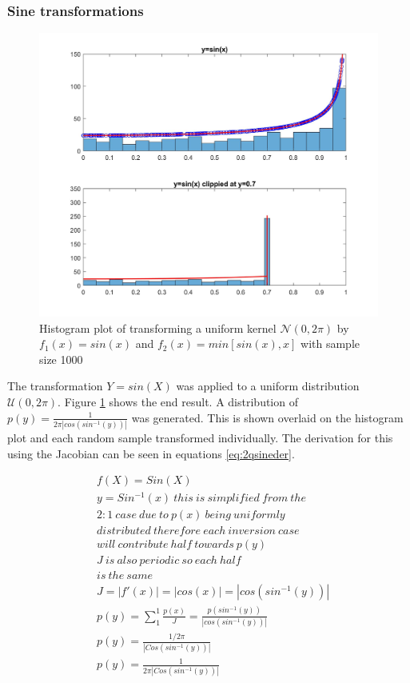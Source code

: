 \documentclass[twoside,twocolumn]{article}
\begin{document}
\subsubsection{Sine transformations}
\begin{figure}[h]
  \centering
    \includegraphics[width=\linewidth]{2sine}
  \caption{Histogram plot of transforming a uniform kernel $\mathcal{N}(0,2\pi)$ by $f_1(x)=sin(x)$ and $f_2(x)=min[sin(x),x]$ with sample size 1000}
  \label{fig:2sine}
\end{figure}

The transformation $Y=sin(X)$ was applied to a uniform distribution $\mathcal{U}(0,2\pi)$. Figure \ref{fig:2sine} shows the end result. A distribution of $p(y)=\frac{1}{2\pi|cos(sin^{-1}(y))|}$ was generated. This is shown overlaid on the histogram plot and each random sample transformed individually. The derivation for this using the Jacobian can be seen in equations \ref{eq:2qsineder}.

\begin{equation}
\label{eq:2qsineder}
\begin{split}
&f(X)=Sin(X)\\
&y=Sin^{-1}(x) \: this \: is \: simplified \: from \: the\\
&2:1 \: case\: due \:to\: p(x)\: being\: uniformly\\
&  distributed \: therefore\: each\: inversion\: case  \\
&will \: contribute \: half\: towards\: p(y)\\ 
&J \: is \: also \: periodic \: so \: each \: half \\
&is \: the \: same\\
&J=|f'(x)|=|cos(x)|=|cos(sin^{-1}(y))|\\
&p(y) = \sum_{1}^{1} \frac{p(x)}{J} = \frac{p(sin^{-1}(y))}{|cos(sin^{-1}(y))|}\\
&p(y)=\frac{1/2\pi}{|Cos(sin^{-1}(y))|}\\
&p(y)=\frac{1}{2\pi|Cos(sin^{-1}(y))|}\\ 
\end{split}
\end{equation} 
\end{document}
